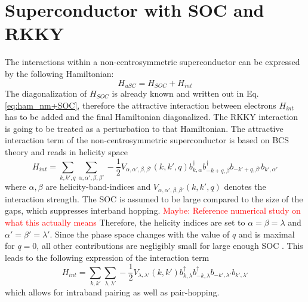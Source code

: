 \section{Superconductor with SOC and RKKY}
The interactions within a non-centrosymmetric superconductor can be expressed by the following Hamiltonian:
\begin{equation}\label{eq:hamiltonian0}
    H_{uSC} = H_{SOC} + H_{int}
\end{equation}
The diagonalization of $H_{SOC}$ is already known and written out in Eq. \eqref{eq:ham_nm+SOC}, therefore the attractive interaction between electrons $H_{int}$ has to be added and the final Hamiltonian diagonalized. 
The RKKY interaction is going to be treated as a perturbation to that Hamiltonian. \newline
The attractive interaction term of the non-centrosymmetric superconductor is based on BCS theory and reads in helicity space
\begin{equation}\nonumber
    H_{int} = \sum_{k,k',q} \sum_{\alpha, \alpha', \beta, \beta'} -\frac{1}{2} V_{\alpha, \alpha', \beta, \beta'}(k,k',q) b^{\dag}_{k,\alpha} b^{\dag}_{-k+q,\beta} b_{-k'+q,\beta'}b_{k', \alpha'}
\end{equation}
where $\alpha,\beta$ are helicity-band-indices and $V_{\alpha, \alpha', \beta, \beta'}(k,k',q)$ denotes the interaction strength. 
The SOC is assumed to be large compared to the size of the gaps, which suppresses interband hopping.
\textcolor{red}{Maybe: Reference numerical study on what this actually means}\newline
Therefore, the helicity indices are set to $\alpha = \beta = \lambda$ and $\alpha' = \beta' = \lambda'$.\newline %
Since the phase space changes with the value of $q$ and is maximal for $q=0$, all other contributions are negligibly small for large enough SOC \cite{samokhin2004cept, samokhin2008gap}. \newline
This leads to the following expression of the interaction term
\begin{equation}\label{eq:hamiltoniankspaceint}
    H_{int} = \sum_{k,k'} \sum_{\lambda, \lambda'} -\frac{1}{2} V_{\lambda, \lambda'}(k,k') b^{\dag}_{k,\lambda} b^{\dag}_{-k,\lambda} b_{-k',\lambda'}b_{k', \lambda'}
\end{equation}
which allows for intraband pairing as well as pair-hopping.
\newline
